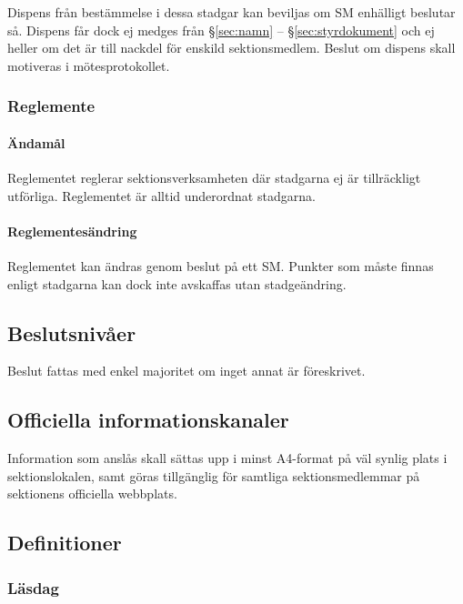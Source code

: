\documentclass{dgovdoc}
\begin{document}
Dispens från bestämmelse i dessa stadgar kan beviljas om SM enhälligt beslutar
så. Dispens får dock ej medges från \S\ref{sec:namn} -- \S\ref{sec:styrdokument}
och ej heller om det är till nackdel för enskild sektionsmedlem. Beslut om
dispens skall motiveras i mötesprotokollet.

\subsubsection{Reglemente}

\paragraph{Ändamål}

Reglementet reglerar sektionsverksamheten där stadgarna ej är tillräckligt
utförliga. Reglementet är alltid underordnat stadgarna.

\paragraph{Reglementesändring}

Reglementet kan ändras genom beslut på ett SM. Punkter som måste finnas enligt
stadgarna kan dock inte avskaffas utan stadgeändring.

\subsection{Beslutsnivåer}

Beslut fattas med enkel majoritet om inget annat är föreskrivet.

\subsection{Officiella informationskanaler}
\label{sec:officiella_informationskanaler}

Information som anslås skall sättas upp i minst A4-format på väl synlig plats i
sektionslokalen, samt göras tillgänglig för samtliga sektionsmedlemmar på
sektionens officiella webbplats.

\subsection{Definitioner}

\subsubsection{Läsdag}
\end{document}
